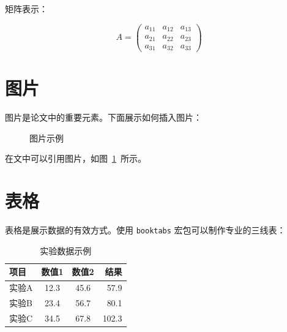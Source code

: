 \documentclass[12pt,a4paper]{article}
\begin{document}
矩阵表示：

\begin{equation}
    A = \begin{pmatrix}
        a_{11} & a_{12} & a_{13} \\
        a_{21} & a_{22} & a_{23} \\
        a_{31} & a_{32} & a_{33}
    \end{pmatrix}
\end{equation}

\section{图片}

图片是论文中的重要元素。下面展示如何插入图片：

\begin{figure}[htbp]
    \centering
    
    
    \caption{图片示例}
    \label{fig:example}
\end{figure}

在文中可以引用图片，如图~\ref{fig:example}~所示。

\section{表格}

表格是展示数据的有效方式。使用 \texttt{booktabs} 宏包可以制作专业的三线表：

\begin{table}[htbp]
    \centering
    \caption{实验数据示例}
    \label{tab:example}
    \begin{tabular}{lccr}
        \toprule
        \textbf{项目} & \textbf{数值1} & \textbf{数值2} & \textbf{结果} \\
        \midrule
        实验A & 12.3 & 45.6 & 57.9 \\
        实验B & 23.4 & 56.7 & 80.1 \\
        实验C & 34.5 & 67.8 & 102.3 \\
        \bottomrule
    \end{tabular}
\end{table}
\end{document}
